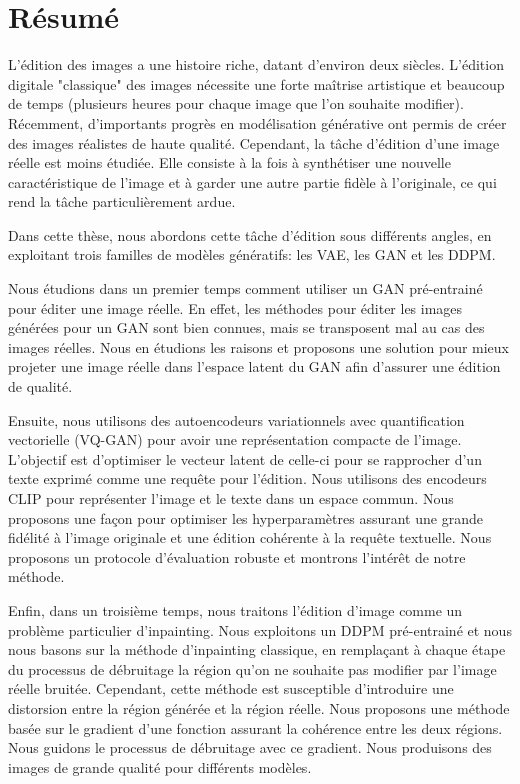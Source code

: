 \cleardoublepage


\chapter{R\'esum\'e}


L'édition des images a une histoire riche, datant d'environ deux siècles. 
L'édition digitale "classique" des images nécessite une forte maîtrise artistique
et beaucoup de temps (plusieurs heures pour chaque image que l'on souhaite modifier).
Récemment, d'importants progrès en modélisation générative ont 
permis de créer des images réalistes de haute qualité. Cependant, la tâche d'édition 
d'une image réelle est moins étudiée. Elle consiste à la fois à synthétiser une nouvelle caractéristique de 
l'image et à garder une autre partie fidèle à l'originale, ce qui rend la tâche 
particulièrement ardue.

Dans cette thèse, nous abordons cette tâche d'édition sous différents angles, en exploitant 
trois familles de modèles génératifs: les \ac{VAE}, les \ac{GAN} et les \ac{DDPM}.

Nous étudions  dans un premier temps comment utiliser un \ac{GAN} pré-entrainé pour éditer 
une image réelle. En effet, les méthodes pour éditer les images générées pour un \ac{GAN} sont 
bien connues, mais se transposent mal au cas des images réelles. Nous en étudions les raisons 
 et proposons une solution pour mieux projeter une image réelle dans l'espace latent du \ac{GAN} 
afin d'assurer une édition de qualité.

Ensuite, nous utilisons des autoencodeurs variationnels avec quantification 
vectorielle (VQ-GAN) pour avoir une représentation compacte de l'image. 
L'objectif est d'optimiser le vecteur latent de celle-ci pour se rapprocher 
d'un texte exprimé comme une requête pour l'édition. 
Nous utilisons des encodeurs CLIP  pour représenter l'image et le texte dans un espace commun.
Nous proposons une façon pour optimiser 
les hyperparamètres assurant une grande fidélité à l'image originale et une édition cohérente à la requête textuelle. 
Nous proposons
un protocole d'évaluation robuste et montrons l'intérêt de notre méthode.

Enfin, dans un troisième temps, nous traitons l'édition d'image comme un problème 
particulier d'inpainting. Nous exploitons un \ac{DDPM} pré-entrainé 
et nous nous basons sur la méthode d'inpainting classique, en remplaçant à chaque étape 
du processus de débruitage la région qu'on ne souhaite pas modifier par l'image réelle bruitée.
Cependant, cette méthode est susceptible d'introduire une distorsion entre la région 
générée et la région réelle. Nous proposons une méthode basée sur le gradient 
d'une fonction assurant la cohérence entre les deux régions. Nous guidons le 
processus de débruitage avec ce gradient. Nous produisons des images de grande qualité pour différents modèles.








